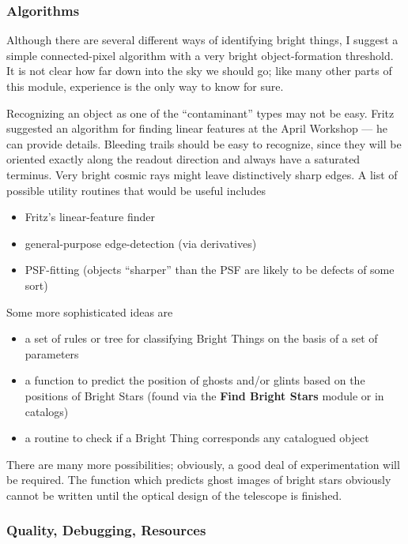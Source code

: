\subsubsection {Algorithms}

  Although there are several different ways of identifying
bright things, I suggest a simple connected-pixel algorithm 
with a very bright object-formation threshold.  It is not
clear how far down into the sky we should go; like many other
parts of this module, experience is the only way to know
for sure.

  Recognizing an object as one of the ``contaminant'' 
types may not be easy.  Fritz suggested an algorithm for
finding linear features at the April Workshop --- he can
provide details.  Bleeding trails should be easy to recognize,
since they will be oriented exactly along the readout direction
and always have a saturated terminus.  Very bright cosmic
rays might leave distinctively sharp edges.  A list of 
possible utility routines that would be useful includes

\begin{itemize}
  \item Fritz's linear-feature finder
  \item general-purpose edge-detection (via derivatives)
  \item PSF-fitting (objects ``sharper'' than the PSF
          are likely to be defects of some sort)
\end{itemize}

  Some more sophisticated ideas are

\begin{itemize}
  \item a set of rules or tree for classifying Bright Things
          on the basis of a set of parameters
  \item a function to predict the position of ghosts and/or
          glints based on the positions of Bright Stars
          (found via the {\bf Find Bright Stars} module
          or in catalogs)
  \item a routine to check if a Bright Thing corresponds
          any catalogued object
\end{itemize}

  There are many more possibilities; obviously,
a good deal of experimentation will be required.
The function which predicts ghost images of bright
stars obviously cannot be written until the optical
design of the telescope is finished.

\subsubsection {Quality, Debugging, Resources}

